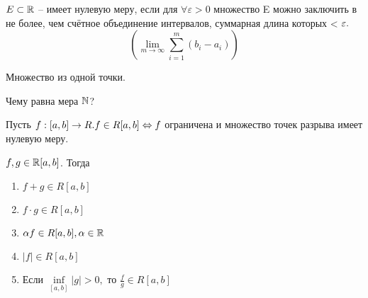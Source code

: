 \begin{Def} 
	$E \subset \mathbb{R}$ -- имеет нулевую меру, если для $\forall \varepsilon > 0$ множество E можно заключить в не более, чем счётное объединение интервалов, суммарная длина
	которых < $\displaystyle  \varepsilon.\\$ \[ (\lim_{m \to \infty} \sum_{i=1}^m (b_i-a_i))\]
\end{Def} 

\begin{Example}
	Множество из одной точки.
\end{Example}

\begin{Ex}
	Чему равна мера $\mathbb{N}$?
\end{Ex}

\begin{Thm} 
	Пусть $f:[a, b] \to R. \\ f \in R[a,b] \Leftrightarrow f$ ограничена и множество точек разрыва имеет нулевую меру.
\end{Thm}

\begin{Thm} 
	$f, g \in \mathbb{R} [a,b]$. Тогда
	\begin{enumerate}
		\item $f+g \in R[a,b]$
		\item $f \cdot g \in R[a,b]$
		\item $\alpha f \in R[a,b], \alpha \in \mathbb{R}$
		\item $|f| \in R[a,b]$
		\item Если $\underset{[a,b]}{\inf} |g| > 0,$ то $\displaystyle \frac{f}{g} \in R[a,b]$
	\end{enumerate}
\end{Thm} 

